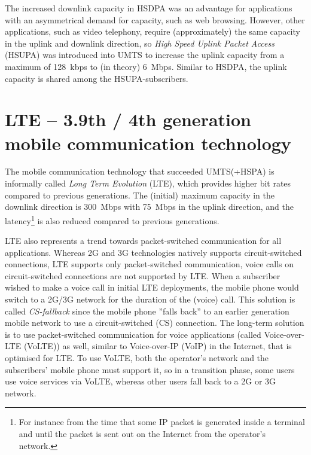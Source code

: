 The increased downlink capacity in HSDPA was an advantage for applications with an asymmetrical demand for capacity, such as web browsing. However,  other applications, such as video telephony, require (approximately) the same capacity in the uplink and downlink direction, so \emph{High Speed Uplink Packet Access} (HSUPA) was introduced into UMTS to increase the uplink capacity from a maximum of 128~kbps to (in theory) 6~Mbps. Similar to HSDPA, the uplink capacity is shared among the HSUPA-subscribers.

\section{LTE -- 3.9th / 4th generation mobile communication technology}\label{sec:lte}
The mobile communication technology that succeeded UMTS(+HSPA) is informally called \emph{Long Term Evolution} (LTE), which provides higher bit rates compared to previous generations. The (initial) maximum capacity in the downlink direction is 300~Mbps with 75~Mbps in the uplink direction, and the latency\footnote{For instance from the time that some IP packet is generated inside a terminal and until the packet is sent out on the Internet from the operator's network.} is also reduced compared to previous generations.

LTE also represents a trend towards packet-switched communication for all applications. Whereas 2G and 3G technologies natively supports circuit-switched connections, LTE supports only packet-switched communication, \ie voice calls on circuit-switched connections are not supported by LTE. When a subscriber wished to make a voice call in initial LTE deployments, the mobile phone would switch to a 2G/3G network for the duration of the (voice) call. This solution is called \emph{CS-fallback} since the mobile phone ''falls back'' to an earlier generation mobile network to use a circuit-switched (CS) connection. The long-term solution is to use packet-switched communication for voice applications (called Voice-over-LTE (VoLTE)) as well, similar to Voice-over-IP (VoIP) in the Internet, that is optimised for LTE. To use VoLTE, both the operator's network and the subscribers' mobile phone must support it, so in a transition phase, some users use voice services via VoLTE, whereas other users fall back to a 2G or 3G network.

